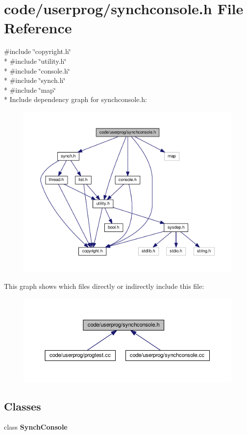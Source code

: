 \section{code/userprog/synchconsole.h File Reference}
\label{synchconsole_8h}
{\ttfamily \#include \char`\"{}copyright.\+h\char`\"{}}\\*
{\ttfamily \#include \char`\"{}utility.\+h\char`\"{}}\\*
{\ttfamily \#include \char`\"{}console.\+h\char`\"{}}\\*
{\ttfamily \#include \char`\"{}synch.\+h\char`\"{}}\\*
{\ttfamily \#include \char`\"{}map\char`\"{}}\\*
Include dependency graph for synchconsole.\+h\+:
\nopagebreak
\begin{figure}[H]
\begin{center}
\leavevmode
\includegraphics[width=350pt]{synchconsole_8h__incl}
\end{center}
\end{figure}
This graph shows which files directly or indirectly include this file\+:
\nopagebreak
\begin{figure}[H]
\begin{center}
\leavevmode
\includegraphics[width=350pt]{synchconsole_8h__dep__incl}
\end{center}
\end{figure}
\subsection*{Classes}
\begin{DoxyCompactItemize}
\item 
class {\bf Synch\+Console}
\end{DoxyCompactItemize}
